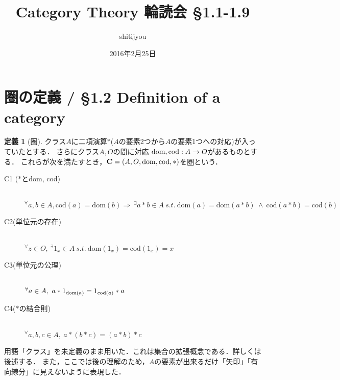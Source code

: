 \documentclass[a4j]{jarticle}
\title{Category Theory 輪読会 \S 1.1-1.9}
\author{shitijyou}
\date{2016年2月25日}
\newcommand {\cat}[1]{%
\mathbf{#1}%
}
\newcommand {\dom}[1]{%
\mathrm{dom}(#1)%
}
\newcommand {\cod}[1]{%
\mathrm{cod}(#1)%
}
\newcommand {\idarrow}[1]{%
1_{#1}%
}
\theoremstyle{definition}
\newtheorem{definition}[theorem]{定義}
\begin{document}
    \maketitle

    \section{圏の定義 / \S 1.2 Definition of a category}
        \begin{definition}[圏]  %
            クラス$A$に二項演算$\ast$($A$の要素2つから$A$の要素1つへの対応)が入っていたとする．
            さらにクラス$A, O$の間に対応 ${\rm dom, cod}: A \rightarrow O$があるものとする．
            これらが次を満たすとき，$\cat{C}=(A, O, {\rm dom ,cod}, \ast)$を圏という．
            \begin{description}

                \item[C1 ($\ast$とdom, cod)]\mbox{} \\
                $^\forall a, b \in A, \cod{a}=\dom{b} \Rightarrow
                ~^\exists a \ast b \in A ~s.t.~ \dom{a}=\dom{a \ast b} ~\wedge~ \cod{a \ast b}=\cod{b}$

                \item[C2(単位元の存在)]\mbox{} \\
                    $^\forall {z} \in O,~ ^\exists \idarrow{x} \in A ~s.t.~
                        \dom{\idarrow{x}}=\cod{\idarrow{x}}=x$

                \item[C3(単位元の公理)]\mbox{} \\
                    $^\forall a \in A,~ a \ast \idarrow{\dom{a}} = \idarrow{\cod{a}} \ast a$

                \item[C4($\ast$の結合則)]\mbox{} \\
                    $^\forall a, b, c \in A,~ a \ast (b \ast c)=(a \ast b) \ast c$
            \end{description}
        \end{definition}

        用語「クラス」を未定義のまま用いた．これは集合の拡張概念である．詳しくは後述する．
        また，ここでは後の理解のため，$A$の要素が出来るだけ「矢印」「有向線分」に見えないように表現した．
\end{document}
